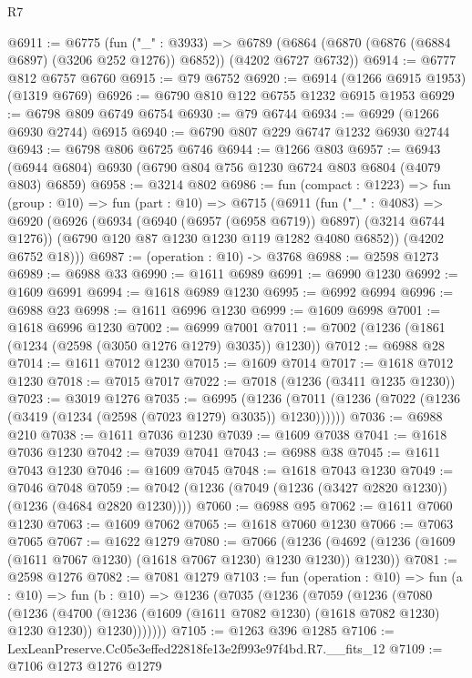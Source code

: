 \begin{lexlean}{R7}
\begin{coremodule}
@6911 := @6775
    (fun ("_" : @3933) =>
    @6789 (@6864 (@6870 (@6876 (@6884 @6897) (@3206 @252 @1276)) @6852)) (@4202 @6727 @6732))
@6914 := @6777 @812 @6757 @6760
@6915 := @79 @6752
@6920 := @6914 (@1266 @6915 @1953) (@1319 @6769)
@6926 := @6790 @810 @122 @6755 @1232 @6915 @1953
@6929 := @6798 @809 @6749 @6754
@6930 := @79 @6744
@6934 := @6929 (@1266 @6930 @2744) @6915
@6940 := @6790 @807 @229 @6747 @1232 @6930 @2744
@6943 := @6798 @806 @6725 @6746
@6944 := @1266 @803
@6957 := @6943 (@6944 @6804) @6930 (@6790 @804 @756 @1230 @6724 @803 @6804 (@4079 @803) @6859)
@6958 := @3214 @802
@6986 := fun (compact : @1223) =>
  fun (group : @10) =>
  fun (part : @10) =>
  @6715
    (@6911
      (fun ("_" : @4083) =>
      @6920
        (@6926
          (@6934 (@6940 (@6957 (@6958 @6719)) @6897) (@3214 @6744 @1276))
          (@6790 @120 @87 @1230 @1230 @119 @1282 @4080 @6852))
        (@4202 @6752 @18)))
@6987 := (operation : @10) -> @3768
@6988 := @2598 @1273
@6989 := @6988 @33
@6990 := @1611 @6989
@6991 := @6990 @1230
@6992 := @1609 @6991
@6994 := @1618 @6989 @1230
@6995 := @6992 @6994
@6996 := @6988 @23
@6998 := @1611 @6996 @1230
@6999 := @1609 @6998
@7001 := @1618 @6996 @1230
@7002 := @6999 @7001
@7011 := @7002 (@1236 (@1861 (@1234 (@2598 (@3050 @1276 @1279) @3035)) @1230))
@7012 := @6988 @28
@7014 := @1611 @7012 @1230
@7015 := @1609 @7014
@7017 := @1618 @7012 @1230
@7018 := @7015 @7017
@7022 := @7018 (@1236 (@3411 @1235 @1230))
@7023 := @3019 @1276
@7035 := @6995
    (@1236 (@7011 (@1236 (@7022 (@1236 (@3419 (@1234 (@2598 (@7023 @1279) @3035)) @1230))))))
@7036 := @6988 @210
@7038 := @1611 @7036 @1230
@7039 := @1609 @7038
@7041 := @1618 @7036 @1230
@7042 := @7039 @7041
@7043 := @6988 @38
@7045 := @1611 @7043 @1230
@7046 := @1609 @7045
@7048 := @1618 @7043 @1230
@7049 := @7046 @7048
@7059 := @7042 (@1236 (@7049 (@1236 (@3427 @2820 @1230)) (@1236 (@4684 @2820 @1230))))
@7060 := @6988 @95
@7062 := @1611 @7060 @1230
@7063 := @1609 @7062
@7065 := @1618 @7060 @1230
@7066 := @7063 @7065
@7067 := @1622 @1279
@7080 := @7066
    (@1236 (@4692 (@1236 (@1609 (@1611 @7067 @1230) (@1618 @7067 @1230) @1230 @1230)) @1230))
@7081 := @2598 @1276
@7082 := @7081 @1279
@7103 := fun (operation : @10) =>
  fun (a : @10) =>
  fun (b : @10) =>
  @1236
    (@7035
      (@1236
        (@7059
          (@1236
            (@7080
              (@1236
                (@4700
                  (@1236 (@1609 (@1611 @7082 @1230) (@1618 @7082 @1230) @1230 @1230))
                  @1230)))))))
@7105 := @1263 @396 @1285
@7106 := LexLeanPreserve.Cc05e3effed22818fe13e2f993e97f4bd.R7.__fits_12
@7109 := @7106 @1273 @1276 @1279

\end{coremodule}
\end{lexlean}
